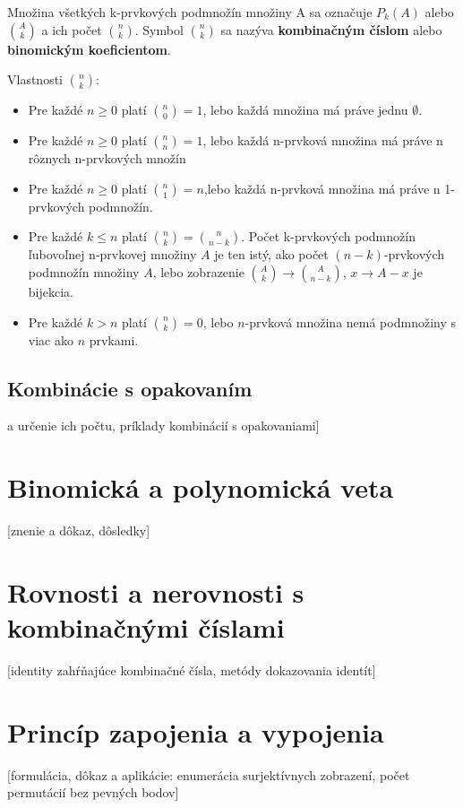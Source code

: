    Množina všetkých k-prvkových podmnožín množiny A sa označuje $P_{k}(A)$ alebo $\binom{A}{k}$ a ich počet $\binom{n}{k}$. Symbol $\binom{n}{k}$ sa nazýva \textbf{kombinačným číslom} alebo \textbf{binomickým koeficientom}.

    Vlastnosti $\binom{n}{k}$:
      \begin{itemize}
        \item Pre každé $n \geq 0$ platí $\binom{n}{0} = 1$, lebo každá množina má práve jednu $\emptyset$.
        \item Pre každé $n \geq 0$ platí $\binom{n}{n} = 1$, lebo každá n-prvková množina má práve n rôznych n-prvkových množín
        \item Pre každé $n \geq 0$ platí $\binom{n}{1} = n$,lebo každá n-prvková množina má práve n 1-prvkových podmnožín.
        \item Pre každé $k \leq n$ platí $\binom{n}{k} = \binom{n}{n-k}$. Počet k-prvkových podmnožín ľubovoľnej n-prvkovej množiny $A$ je ten istý, ako počet $(n-k)$-prvkových podmnožín množiny $A$, lebo zobrazenie $\binom{A}{k} \rightarrow \binom{A}{n-k}$, $x \rightarrow A - x$ je bijekcia.
        \item Pre každé $k > n$ platí $\binom{n}{k} = 0$, lebo $n$-prvková  množina nemá podmnožiny s viac ako $n$ prvkami.
      \end{itemize}




  
  \subsection{Kombinácie s opakovaním}



   a určenie ich počtu, príklady kombinácií s opakovaniami] 

\section {Binomická a polynomická veta}
  [znenie a dôkaz, dôsledky] 

\section {Rovnosti a nerovnosti s kombinačnými číslami}
  [identity zahŕňajúce kombinačné čísla, metódy dokazovania identít]

\section {Princíp zapojenia a vypojenia}
  [formulácia, dôkaz a aplikácie: enumerácia surjektívnych zobrazení, počet permutácií bez pevných bodov]






